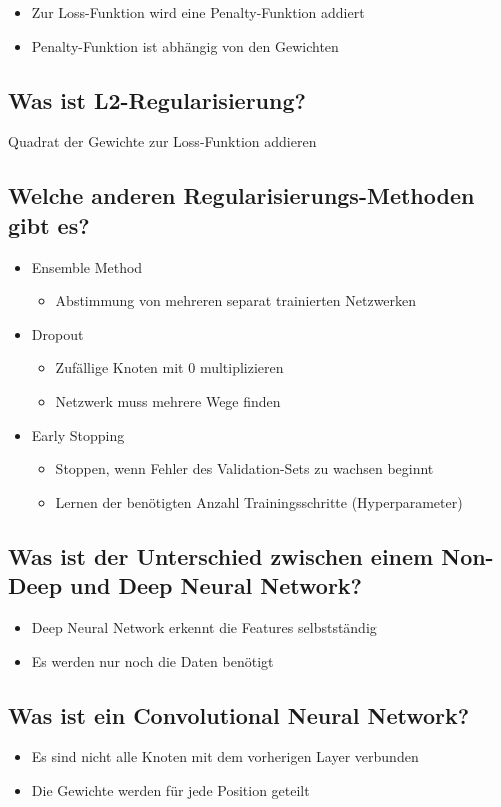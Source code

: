 \documentclass[a4paper]{article}
\begin{document}
		\begin{itemize}
			\item Zur Loss-Funktion wird eine Penalty-Funktion addiert
			\item Penalty-Funktion ist abhängig von den Gewichten
		\end{itemize}
	
		\subsection{Was ist L2-Regularisierung?}
		
		Quadrat der Gewichte zur Loss-Funktion addieren
		
		\subsection{Welche anderen Regularisierungs-Methoden gibt es?}
		
		\begin{itemize}
			\item Ensemble Method
				\begin{itemize}
					\item Abstimmung von mehreren separat trainierten Netzwerken
				\end{itemize}
			\item Dropout
				\begin{itemize}
					\item Zufällige Knoten mit 0 multiplizieren
					\item Netzwerk muss mehrere Wege finden
				\end{itemize}
			\item Early Stopping
				\begin{itemize}
					\item Stoppen, wenn Fehler des Validation-Sets zu wachsen beginnt
					\item Lernen der benötigten Anzahl Trainingsschritte (Hyperparameter)
				\end{itemize}
		\end{itemize}
	
		\subsection{Was ist der Unterschied zwischen einem Non-Deep und Deep Neural Network?}
		
		\begin{itemize}
			\item Deep Neural Network erkennt die Features selbstständig
			\item Es werden nur noch die Daten benötigt
		\end{itemize}
	
		\subsection{Was ist ein Convolutional Neural Network?}
		
		\begin{itemize}
			\item Es sind nicht alle Knoten mit dem vorherigen Layer verbunden
			\item Die Gewichte werden für jede Position geteilt
		\end{itemize}
		
		
		
		
		
		
	
\end{document}
